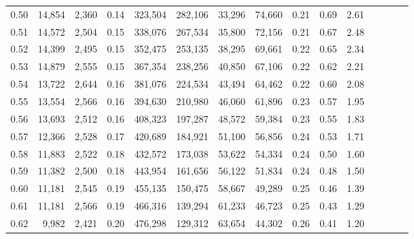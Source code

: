 \begin{tabular}{rrrcrrrrrrrrrrr}
0.50 &  14,854 &  2,360 &                                       0.14 &  323,504 &  282,106 &   33,296 &   74,660 &  0.21 &  0.69 &                         2.61 \\
0.51 &  14,572 &  2,504 &                                       0.15 &  338,076 &  267,534 &   35,800 &   72,156 &  0.21 &  0.67 &                         2.48 \\
0.52 &  14,399 &  2,495 &                                       0.15 &  352,475 &  253,135 &   38,295 &   69,661 &  0.22 &  0.65 &                         2.34 \\
0.53 &  14,879 &  2,555 &                                       0.15 &  367,354 &  238,256 &   40,850 &   67,106 &  0.22 &  0.62 &                         2.21 \\
0.54 &  13,722 &  2,644 &                                       0.16 &  381,076 &  224,534 &   43,494 &   64,462 &  0.22 &  0.60 &                         2.08 \\
0.55 &  13,554 &  2,566 &                                       0.16 &  394,630 &  210,980 &   46,060 &   61,896 &  0.23 &  0.57 &                         1.95 \\
0.56 &  13,693 &  2,512 &                                       0.16 &  408,323 &  197,287 &   48,572 &   59,384 &  0.23 &  0.55 &                         1.83 \\
0.57 &  12,366 &  2,528 &                                       0.17 &  420,689 &  184,921 &   51,100 &   56,856 &  0.24 &  0.53 &                         1.71 \\
0.58 &  11,883 &  2,522 &                                       0.18 &  432,572 &  173,038 &   53,622 &   54,334 &  0.24 &  0.50 &                         1.60 \\
0.59 &  11,382 &  2,500 &                                       0.18 &  443,954 &  161,656 &   56,122 &   51,834 &  0.24 &  0.48 &                         1.50 \\
0.60 &  11,181 &  2,545 &                                       0.19 &  455,135 &  150,475 &   58,667 &   49,289 &  0.25 &  0.46 &                         1.39 \\
0.61 &  11,181 &  2,566 &                                       0.19 &  466,316 &  139,294 &   61,233 &   46,723 &  0.25 &  0.43 &                         1.29 \\
0.62 &   9,982 &  2,421 &                                       0.20 &  476,298 &  129,312 &   63,654 &   44,302 &  0.26 &  0.41 &                         1.20 \\

\end{tabular}
